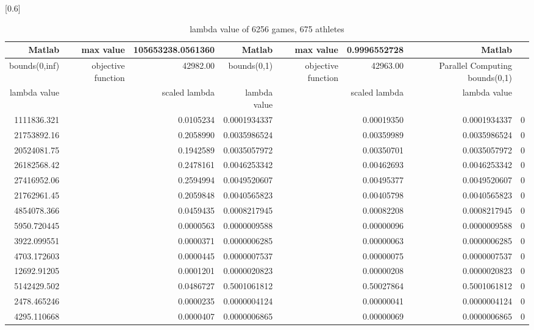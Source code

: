 \documentclass[
journal=jacsat, %
manuscript=article]{achemso}
\begin{document}
\begin{table}[htbp]
  \centering
  \caption{lambda value of 6256 games, 675 athletes}
  \scalebox{0.6}[0.6]{%
    \begin{tabular}{rrrrrrrr}
    \toprule
        Matlab & max value & 105653238.0561360 & Matlab & max value & 0.9996552728 & Matlab \\
    \hline
    bounds(0,inf) & objective function & 42982.00 & bounds(0,1) & objective function & 42963.00 &  Parallel Computing bounds(0,1) \\
    \hline
    lambda value &       & scaled lambda & lambda value  &       & scaled lambda & lambda value  \\
    \bottomrule
    1111836.321 &       & 0.0105234 & 0.0001934337 &       & 0.00019350 & 0.0001934337 & 0 \\
    21753892.16 &       & 0.2058990 & 0.0035986524 &       & 0.00359989 & 0.0035986524 & 0 \\
    20524081.75 &       & 0.1942589 & 0.0035057972 &       & 0.00350701 & 0.0035057972 & 0 \\
    26182568.42 &       & 0.2478161 & 0.0046253342 &       & 0.00462693 & 0.0046253342 & 0 \\
    27416952.06 &       & 0.2594994 & 0.0049520607 &       & 0.00495377 & 0.0049520607 & 0 \\
    21762961.45 &       & 0.2059848 & 0.0040565823 &       & 0.00405798 & 0.0040565823 & 0 \\
    4854078.366 &       & 0.0459435 & 0.0008217945 &       & 0.00082208 & 0.0008217945 & 0 \\
    5950.720445 &       & 0.0000563 & 0.0000009588 &       & 0.00000096 & 0.0000009588 & 0 \\
    3922.099551 &       & 0.0000371 & 0.0000006285 &       & 0.00000063 & 0.0000006285 & 0 \\
    4703.172603 &       & 0.0000445 & 0.0000007537 &       & 0.00000075 & 0.0000007537 & 0 \\
    12692.91205 &       & 0.0001201 & 0.0000020823 &       & 0.00000208 & 0.0000020823 & 0 \\
    5142429.502 &       & 0.0486727 & 0.5001061812 &       & 0.50027864 & 0.5001061812 & 0 \\
    2478.465246 &       & 0.0000235 & 0.0000004124 &       & 0.00000041 & 0.0000004124 & 0 \\
    4295.110668 &       & 0.0000407 & 0.0000006865 &       & 0.00000069 & 0.0000006865 & 0 \\

\end{tabular}}
\end{table}
\end{document}

